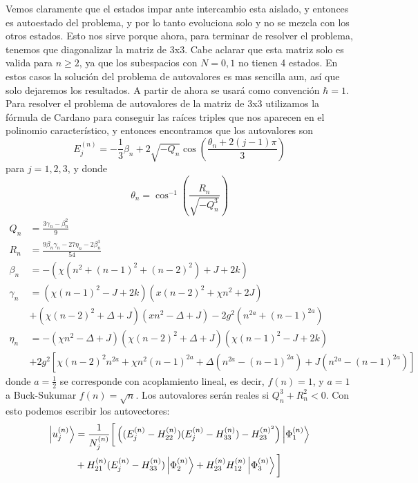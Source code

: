 Vemos claramente que el estados impar ante intercambio esta aislado, y entonces es autoestado del problema, y por lo tanto evoluciona solo y no se mezcla con los otros estados. Esto nos sirve porque ahora, para terminar de resolver el problema, tenemos que diagonalizar la matriz de 3x3. Cabe aclarar que esta matriz solo es valida para $n\geq 2$, ya que los subespacios con $N=0,1$ no tienen 4 estados. En estos casos la soluci\'on del problema de autovalores es mas sencilla aun, as\'i que solo dejaremos los resultados. A partir de ahora se usar\'a como convención $\hbar=1$. \newline
Para resolver el problema de autovalores de la matriz de 3x3 utilizamos la fórmula de Cardano para conseguir las ra\'ices triples que nos aparecen en el polinomio caracter\'istico, y entonces encontramos que los autovalores son
\begin{equation}
    E_j^{(n)}=-\frac{1}{3}\beta_n+2\sqrt{-Q_n}\cos{\left(\frac{\theta_n+2(j-1)\pi}{3}\right)}
    \label{ec4:autoenergias}
\end{equation}
para $j=1,2,3$, y donde 
\begin{equation}
    \theta_n=\cos^{-1}\left(\frac{R_n}{\sqrt{-Q_n^3}}\right)
\end{equation}
\begin{equation}
    \begin{aligned}
        Q_n & = \frac{3\gamma_n-\beta_n^2}{9} \\
        R_n & = \frac{9\beta_n\gamma_n-27\eta_n-2\beta_n^3}{54} \\
        \beta_n & = - \left( \chi(n^2+(n-1)^2+(n-2)^2)+J+2k\right) \\
        \gamma_n & = (\chi(n-1)^2 - J + 2k)(x(n-2)^2+\chi n^2+2J) \\ 
        & +(\chi (n-2)^2+\Delta+J)(x n^2-\Delta+J)-2g^2(n^{2a}+(n-1)^{2a}) \\ 
        \eta_n &= -(\chi n^2-\Delta+J)(\chi(n-2)^2+\Delta+J)(\chi(n-1)^2-J+2k) \\
        &+2g^2 \left[  \chi(n-2)^2n^{2a}+\chi n^2(n-1)^{2a}+\Delta\left(n^{2a}-(n-1)^{2a}\right) +J(n^{2a}-(n-1)^{2a})\right]
    \end{aligned} 
    \label{ec4:parametros solucion}
\end{equation}
donde $a=\frac{1}{2}$ se corresponde con acoplamiento lineal, es decir, $f(n)=1$, y $a=1$ a Buck-Sukumar $f(n)=\sqrt{n}$. Los autovalores ser\'an reales si $Q_n^3+R_n^2<0$.
Con esto podemos escribir los autovectores:
\begin{equation}
    \begin{split}
        \ket{u_j^{(n)}} &= \frac{1}{N_j^{(n)}} \bigg[ \left((E_j^{(n)} - H_{22}^{(n)})(E_j^{(n)}-H_{33}^{(n)}) - H_{23}^{(n)^2} \right) \ket{\Phi_1^{(n)}} \\ &+ H_{21}^{(n)}(E_j^{(n)}-H_{33}^{(n)})\ket{\Phi_2^{(n)}} + H_{23}^{(n)}H_{12}^{(n)}\ket{\Phi_3^{(n)}}\bigg]
    \end{split}
\end{equation}
